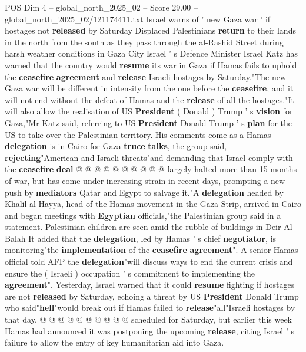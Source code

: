 \begin{textsample}{POS Dim 4 – global\_north\_2025\_02 – Score 29.00 – global\_north\_2025\_02/121174411.txt}  \label{ex:f4_pos_053}
Israel warns of ' new Gaza war ' if hostages not \textbf{released} by Saturday Displaced Palestinians \textbf{return} to their lands in the north from the south as they pass through the al-Rashid Street during harsh weather conditions in Gaza City Israel ' s Defence Minister Israel Katz has warned that the country would \textbf{resume} its war in Gaza if Hamas fails to uphold the \textbf{ceasefire} \textbf{agreement} and \textbf{release} Israeli hostages by Saturday."The new Gaza war will be different in intensity from the one before the \textbf{ceasefire}, and it will not end without the defeat of Hamas and the \textbf{release} of all the hostages."It will also allow the realisation of US \textbf{President} ( Donald ) Trump ' s \textbf{vision} for Gaza,"Mr Katz said, referring to US \textbf{President} Donald Trump ' s \textbf{plan} for the US to take over the Palestinian territory.
His comments come as a Hamas \textbf{delegation} is in Cairo for Gaza \textbf{truce} \textbf{talks}, the group said, \textbf{rejecting}"American and Israeli threats"and demanding that Israel comply with the \textbf{ceasefire} \textbf{deal} @ @ @ @ @ @ @ @ @ @ largely halted more than 15 months of war, but has come under increasing strain in recent days, prompting a new push by \textbf{mediators} Qatar and Egypt to salvage it."A \textbf{delegation} headed by Khalil al-Hayya, head of the Hamas movement in the Gaza Strip, arrived in Cairo and began meetings with \textbf{Egyptian} officials,"the Palestinian group said in a statement.
Palestinian children are seen amid the rubble of buildings in Deir Al Balah It added that the \textbf{delegation}, led by Hamas ' s chief \textbf{negotiator}, is monitoring"the \textbf{implementation} of the \textbf{ceasefire} \textbf{agreement}".
A senior Hamas official told AFP the \textbf{delegation}"will discuss ways to end the current crisis and ensure the ( Israeli ) occupation ' s commitment to implementing the \textbf{agreement}".
Yesterday, Israel warned that it could \textbf{resume} fighting if hostages are not \textbf{released} by Saturday, echoing a threat by US \textbf{President} Donald Trump who said"\textbf{hell}"would break out if Hamas failed to \textbf{release}"all"Israeli hostages by that day. @ @ @ @ @ @ @ @ @ @ scheduled for Saturday, but earlier this week Hamas had announced it was postponing the upcoming \textbf{release}, citing Israel ' s failure to allow the entry of key humanitarian aid into Gaza.

\end{textsample}
